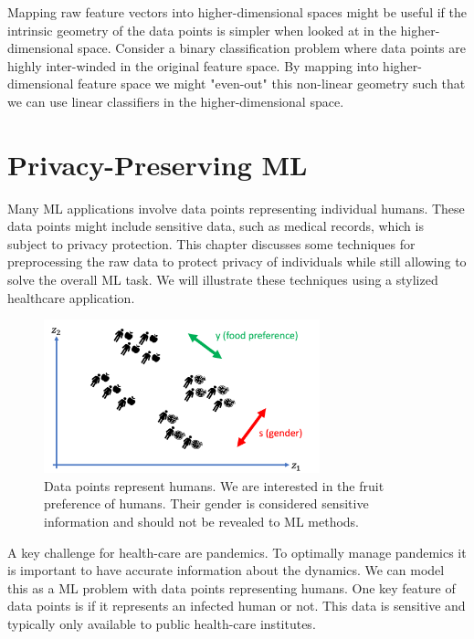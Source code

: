 \documentclass[12pt]{report}
\begin{document}
Mapping raw feature vectors into higher-dimensional spaces might be useful 
if the intrinsic geometry of the data points is simpler when looked at in the 
higher-dimensional space. Consider a binary classification problem where 
data points are highly inter-winded in the original feature space. By mapping 
into higher-dimensional feature space we might "even-out" this non-linear 
geometry such that we can use linear classifiers in the higher-dimensional space. 


\chapter{Privacy-Preserving ML}
\label{chap_privacy_preserving_ML}

Many ML applications involve data points representing individual humans. 
These data points might include sensitive data, such as medical records, 
which is subject to privacy protection. This chapter discusses some techniques 
for preprocessing the raw data to protect privacy of individuals while still allowing 
to solve the overall ML task. We will illustrate these techniques using a stylized 
healthcare application. 

\begin{figure}[htbp]
	\centering
	\includegraphics[width=8cm]{PrivacyPreservingCartoon.png}
	\caption{Data points represent humans. We are interested in the fruit 
		preference of humans. Their gender is considered sensitive information 
		and should not be revealed to ML methods.}
	\label{fig:ppmlcartoon}
\end{figure}

A key challenge for health-care are pandemics. To optimally manage pandemics 
it is important to have accurate information about the dynamics. We can model 
this as a ML problem with data points representing humans. One key feature of 
data points is if it represents an infected human or not. This data is sensitive 
and typically only available to public health-care institutes. 
\end{document}
